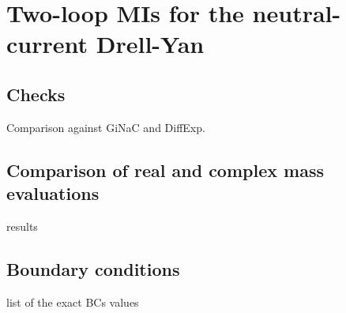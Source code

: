 \section{Two-loop MIs for the neutral-current Drell-Yan}
\label{sec:results}

\subsection{Checks}
Comparison against GiNaC and DiffExp.
\subsection{Comparison of real and complex mass evaluations}
results
\subsection{Boundary conditions}
list of the exact BCs values


